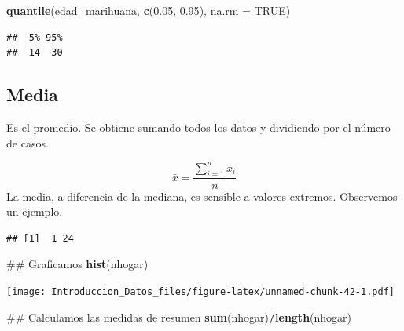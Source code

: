\documentclass[spanish,]{book}
\newenvironment{Shaded}{\begin{snugshade}}{\end{snugshade}}
\newcommand{\KeywordTok}[1]{\textcolor[rgb]{0.13,0.29,0.53}{\textbf{#1}}}
\newcommand{\DataTypeTok}[1]{\textcolor[rgb]{0.13,0.29,0.53}{#1}}
\newcommand{\FloatTok}[1]{\textcolor[rgb]{0.00,0.00,0.81}{#1}}
\newcommand{\StringTok}[1]{\textcolor[rgb]{0.31,0.60,0.02}{#1}}
\newcommand{\OtherTok}[1]{\textcolor[rgb]{0.56,0.35,0.01}{#1}}
\newcommand{\OperatorTok}[1]{\textcolor[rgb]{0.81,0.36,0.00}{\textbf{#1}}}
\newcommand{\NormalTok}[1]{#1}
\begin{document}
\begin{Shaded}
\begin{Highlighting}[]
\KeywordTok{quantile}\NormalTok{(edad_marihuana, }\KeywordTok{c}\NormalTok{(}\FloatTok{0.05}\NormalTok{, }\FloatTok{0.95}\NormalTok{), }\DataTypeTok{na.rm =} \OtherTok{TRUE}\NormalTok{)}
\end{Highlighting}
\end{Shaded}

\begin{verbatim}
##  5% 95% 
##  14  30
\end{verbatim}

\subsection{Media}\label{media}

Es el promedio. Se obtiene sumando todos los datos y dividiendo por el
número de casos.

\[
\bar{x} = \frac{\displaystyle \sum_{i=1}^n x_i}{n}
\] La media, a diferencia de la mediana, es sensible a valores extremos.
Observemos un ejemplo.

\begin{Shaded}
\end{Shaded}

\begin{verbatim}
## [1]  1 24
\end{verbatim}

\begin{Shaded}
\begin{Highlighting}[]
\NormalTok{## Graficamos}
\KeywordTok{hist}\NormalTok{(nhogar)}
\end{Highlighting}
\end{Shaded}

\texttt{[image: Introduccion\_Datos\_files/figure-latex/unnamed-chunk-42-1.pdf]}

\begin{Shaded}
\begin{Highlighting}[]
\NormalTok{## Calculamos las medidas de resumen}
\KeywordTok{sum}\NormalTok{(nhogar)}\OperatorTok{/}\KeywordTok{length}\NormalTok{(nhogar)}
\end{Highlighting}
\end{Shaded}
\end{document}
